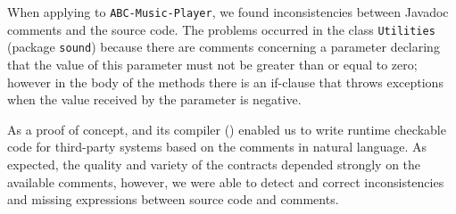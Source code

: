 When applying \contractjdoc{} to \texttt{ABC-Music-Player}, we found inconsistencies between Javadoc comments and the source code. The problems occurred in the class \texttt{Utilities} (package
\texttt{sound}) because there are comments concerning a parameter declaring that the value of
this parameter must not be greater than or equal to zero; however in the body of the methods there
is an if-clause that throws exceptions when the value received by the parameter is negative.

As a proof of concept, \contractjdoc{} and its compiler (\contractjdocCompiler{}) enabled us to write runtime
checkable code for third-party systems based on the comments in natural
language.
As expected, the quality and variety of the contracts depended strongly on the available comments, however, we were able to
detect and correct inconsistencies and missing expressions between source code and comments.




